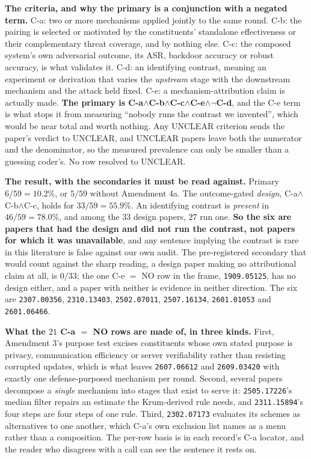 \documentclass{article}
\begin{document}
\textbf{The criteria, and why the primary is a conjunction with a negated term.} C-a: two or more mechanisms applied jointly to the same round. C-b: the pairing is selected or motivated by the constituents' standalone effectiveness or their complementary threat coverage, and by nothing else. C-c: the composed system's own adversarial outcome, its ASR, backdoor accuracy or robust accuracy, is what validates it. C-d: an identifying contrast, meaning an experiment or derivation that varies the \emph{upstream} stage with the downstream mechanism and the attack held fixed. C-e: a mechanism-attribution claim is actually made. \textbf{The primary is C-a$\wedge$C-b$\wedge$C-c$\wedge$C-e$\wedge\neg$C-d}, and the C-e term is what stops it from measuring ``nobody runs the contrast we invented'', which would be near total and worth nothing. Any UNCLEAR criterion sends the paper's verdict to UNCLEAR, and UNCLEAR papers leave both the numerator and the denominator, so the measured prevalence can only be smaller than a guessing coder's. No row resolved to UNCLEAR.

\textbf{The result, with the secondaries it must be read against.} Primary $6/59 = 10.2\%$, or $5/59$ without Amendment 4a. The outcome-gated \emph{design}, C-a$\wedge$C-b$\wedge$C-c, holds for $33/59 = 55.9\%$. An identifying contrast is \emph{present} in $46/59 = 78.0\%$, and among the $33$ design papers, $27$ run one. \textbf{So the six are papers that had the design and did not run the contrast, not papers for which it was unavailable}, and any sentence implying the contrast is rare in this literature is false against our own audit. The pre-registered secondary that would count against the sharp reading, a design paper making no attributional claim at all, is $0/33$; the one C-e $=$ NO row in the frame, \texttt{1909.05125}, has no design either, and a paper with neither is evidence in neither direction. The six are \texttt{2307.00356}, \texttt{2310.13403}, \texttt{2502.07011}, \texttt{2507.16134}, \texttt{2601.01053} and \texttt{2601.06466}.

\textbf{What the $21$ C-a $=$ NO rows are made of, in three kinds.} First, Amendment 3's purpose test excises constituents whose own stated purpose is privacy, communication efficiency or server verifiability rather than resisting corrupted updates, which is what leaves \texttt{2607.06612} and \texttt{2609.03420} with exactly one defense-purposed mechanism per round. Second, several papers decompose a \emph{single} mechanism into stages that exist to serve it: \texttt{2505.17226}'s median filter repairs an estimate the Krum-derived rule needs, and \texttt{2311.15894}'s four steps are four steps of one rule. Third, \texttt{2302.07173} evaluates its schemes as alternatives to one another, which C-a's own exclusion list names as a menu rather than a composition. The per-row basis is in each record's C-a locator, and the reader who disagrees with a call can see the sentence it rests on.
\end{document}
